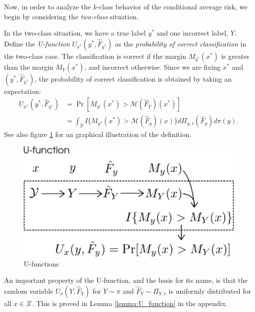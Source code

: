 Now, in order to analyze the $k$-class behavior of the conditional
average risk, we begin by considering the \emph{two-class} situation.

In the two-class situation, we have a true label $y^*$ and one
incorrect label, $Y$.  Define the \emph{U-function} $U_{x^*}(y^*,
\hat{F}_{y^*})$ as the \emph{probability of correct classification} in
the two-class case.  The classification is correct if the margin
$M_{y^*}(x^*)$ is greater than the margin $M_Y(x^*)$, and incorrect
otherwise.  Since we are fixing $x^*$ and $(y^*, \hat{F}_{y^*})$, the
probability of correct classification is obtained by taking an
expectation:
\begin{align}\label{eq:U_function}
U_{x^*}(y^*, \hat{F}_{y^*}) &= \Pr[M_{y^*}(x^*) > \mathcal{M}(\hat{F}_Y)(x^*)]
\\&= \int_{\mathcal{Y}} 
I\{
M_{y^*}(x^*) > \mathcal{M}(\hat{F}_{y})(x)
\}
d\Pi_{y, r}(\hat{F}_y)
d\pi(y).
\end{align}
See also figure \ref{fig:U_function} for an graphical illustration of
the definition.

\begin{figure}[h]
\centering
\includegraphics[scale = 0.4]{../extrapolation_figures/U_function.png}
\caption{U-functions}\label{fig:U_function}
\end{figure}

An important property of the U-function, and the basis for its name,
is that the random variable $U_x(Y, \hat{F}_Y)$ for $Y \sim \pi$ and
$\hat{F}_Y \sim \Pi_{Y, r}$ is uniformly distributed for all
$x \in \mathcal{X}$.  This is proved in Lemma \ref{lemma:U_function}
in the appendix.

